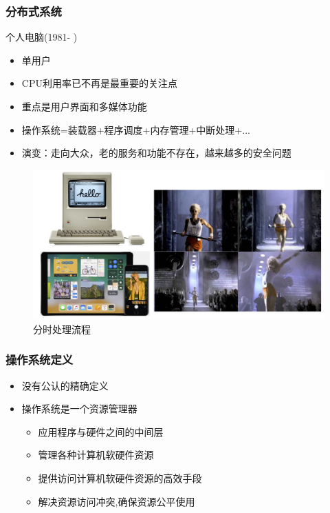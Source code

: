 \documentclass[UTF8]{ctexbeamer}
\begin{document}
\begin{frame}
	
	\frametitle{分布式系统}
	
	个人电脑(1981- )
	\begin{itemize}
		\item 单用户
		\item CPU利用率已不再是最重要的关注点	
		\item 重点是用户界面和多媒体功能
		\item 操作系统=装载器+程序调度+内存管理+中断处理+...
		\item 演变：走向大众，老的服务和功能不存在，越来越多的安全问题
	\end{itemize}
	
	\begin{figure}
		\centering
		\includegraphics[width=0.8\linewidth]{history-pc}
		\caption{分时处理流程}
	\end{figure}
	
\end{frame}



\begin{frame}
\frametitle{操作系统定义}

\begin{itemize}
	\item 没有公认的精确定义
	\item 操作系统是一个资源管理器
	\begin{itemize}
		\item 应用程序与硬件之间的中间层
		\item 管理各种计算机软硬件资源
		\item 提供访问计算机软硬件资源的高效手段
		\item 解决资源访问冲突,确保资源公平使用
	\end{itemize}
\end{itemize}

\end{frame}
\end{document}
